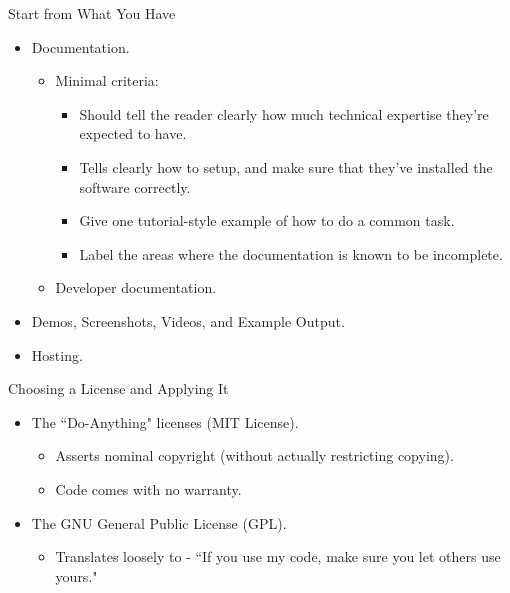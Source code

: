 \documentclass{beamer}
\begin{document}
\begin{frame}{Start from What You Have}
\begin{itemize}
	\item Documentation. 
	\begin{itemize}
		\item Minimal criteria: 
		\begin{itemize}
			\item Should tell the reader clearly how much technical expertise they're expected to have. 
			\item Tells clearly how to setup, and make sure that they've installed the software correctly. 
			\item Give one tutorial-style example of how to do a common task. 
			\item Label the areas where the documentation is known to be incomplete. 	
		\end{itemize}
		\item Developer documentation.	
	\end{itemize}
	\item Demos, Screenshots, Videos, and Example Output. 
	\item Hosting.
\end{itemize}
\end{frame}

\begin{frame}{Choosing a License and Applying It} 
\begin{itemize}
	\item The ``Do-Anything" licenses (MIT License). 
	\begin{itemize}
		\item Asserts nominal copyright (without actually restricting copying). 
		\item Code comes with no warranty. 
	\end{itemize}
	\item The GNU General Public License (GPL). 
	\begin{itemize}
		\item Translates loosely to - ``If you use my code, make sure you let others use yours."
	\end{itemize}
\end{itemize}
\end{frame}
\end{document}
